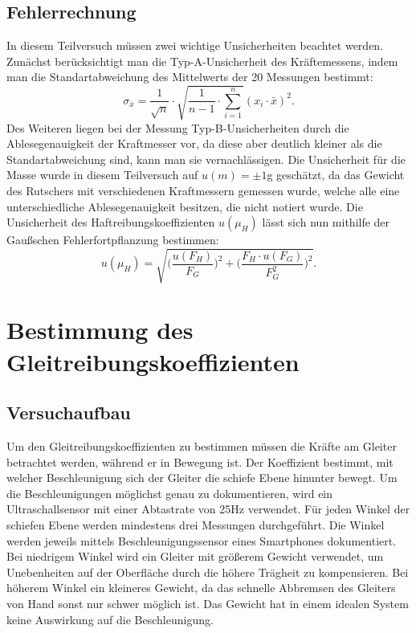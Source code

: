 \documentclass{article}
\begin{document}
\subsection{Fehlerrechnung}
In diesem Teilversuch müssen zwei wichtige Unsicherheiten beachtet werden. Zunächst berücksichtigt man die Typ-A-Unsicherheit des Kräftemessens, indem man die Standartabweichung des Mittelwerts der 20 Messungen bestimmt:
\begin{equation}
   \sigma_{\bar{x}} = \frac{1}{\sqrt{n}} \cdot \sqrt{\frac{1}{n-1} \cdot \sum^n_{i=1}} (x_i \cdot \bar{x})^2 .
\end{equation} Des Weiteren liegen bei der Messung Typ-B-Unsicherheiten durch die Ablesegenauigkeit der Kraftmesser vor, da diese aber deutlich kleiner als die Standartabweichung sind, kann man sie vernachlässigen. Die Unsicherheit für die Masse wurde in diesem Teilversuch auf $u(m) = \pm  1$g geschätzt, da das Gewicht des Rutschers mit verschiedenen Kraftmessern gemessen wurde, welche alle eine unterschiedliche Ablesegenauigkeit besitzen, die nicht notiert wurde.
Die Unsicherheit des Haftreibungskoeffizienten $u(\mu_H)$ lässt sich nun mithilfe der Gaußschen Fehlerfortpflanzung bestimmen:
\begin{equation}
    u(\mu_{H}) = \sqrt{\bigg(\frac{u(F_H)}{F_G}\bigg)^2+\bigg(\frac{F_H \cdot u(F_G)}{F_G^2}\bigg)^2}.
\end{equation}
\section{Bestimmung des Gleitreibungskoeffizienten}
\subsection{Versuchaufbau}
Um den Gleitreibungskoeffizienten zu bestimmen müssen die Kräfte am Gleiter betrachtet werden, während er in Bewegung ist.
Der Koeffizient bestimmt, mit welcher Beschleunigung sich der Gleiter die schiefe Ebene hinunter bewegt.
Um die Beschleunigungen möglichst genau zu dokumentieren, wird ein Ultraschallsensor mit einer Abtastrate von 25Hz verwendet.
Für jeden Winkel der schiefen Ebene werden mindestens drei Messungen durchgeführt.
Die Winkel werden jeweils mittels Beschleunigungssensor eines Smartphones dokumentiert.
Bei niedrigem Winkel wird ein Gleiter mit größerem Gewicht verwendet, um Unebenheiten auf der Oberfläche durch die höhere Trägheit zu kompensieren.
Bei höherem Winkel ein kleineres Gewicht, da das schnelle Abbremsen des Gleiters von Hand sonst nur schwer möglich ist.
Das Gewicht hat in einem idealen System keine Auswirkung auf die Beschleunigung.
\end{document}
